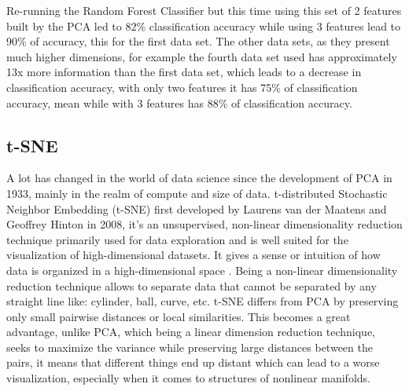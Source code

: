 Re-running the Random Forest Classifier but this time using this set of 2 features built by the PCA led to 82\% classification accuracy while using 3 features lead to 90\% of accuracy, this for the first data set. The other data sets, as they present much higher dimensions, for example the fourth data set used has approximately 13x more information than the first data set, which leads to a decrease in classification accuracy, with only two features it has 75\% of classification accuracy, mean while with 3 features has 88\% of classification accuracy.


\subsection{t-SNE} %
\label{sec:tsne}
\hspace{10px}A lot has changed in the world of data science since the development of PCA in 1933, mainly in the realm of compute and size of data. t-distributed Stochastic Neighbor Embedding (t-SNE) first developed by Laurens van der Maatens and Geoffrey Hinton in 2008, it's an unsupervised, non-linear dimensionality reduction technique primarily used for data exploration and is well suited for the visualization of high-dimensional datasets. It gives a sense or intuition of how data is organized in a high-dimensional space \cite{Laurens}. Being a non-linear dimensionality reduction technique allows to separate data that cannot be separated by any straight line like: cylinder, ball, curve, etc. t-SNE differs from PCA by preserving only small pairwise distances or local similarities. This becomes a great advantage, unlike PCA, which being a linear dimension reduction technique, seeks to maximize the variance while preserving large distances between the pairs, it means that different things end up distant which can lead to a worse visualization, especially when it comes to structures of nonlinear manifolds.


